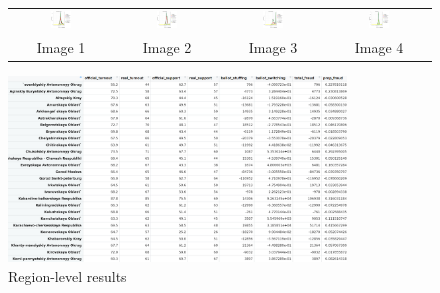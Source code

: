 \documentclass{article}
\begin{document}
\begin{figure}[h]
\centering
\begin{tabular}{cccc}
\includegraphics[width=0.22\textwidth]{inst/figures/img_2D_1.png} &
\includegraphics[width=0.22\textwidth]{inst/figures/img_2D_2.png} &
\includegraphics[width=0.22\textwidth]{inst/figures/img_2D_3.png} &
\includegraphics[width=0.22\textwidth]{inst/figures/img_2D_4.png} \\
Image 1 & Image 2 & Image 3 & Image 4 \\
\end{tabular}
\end{figure}

\begin{figure}[h]
\centering
\includegraphics[width=0.8\textwidth]{inst/figures/EFT_table3.png}
\caption{Region-level results}
\end{figure}
\end{document}
